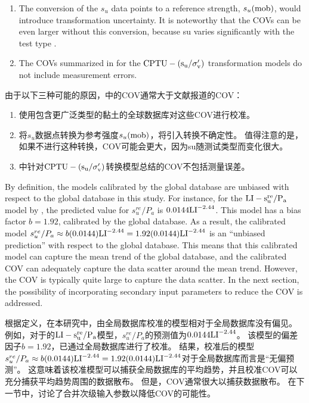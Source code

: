 \begin{paracol}{2}
\begin{enumerate}
        \item The conversion of the $s_u$ data points to a reference strength, $s_u(\rm{mob})$, would introduce transformation uncertainty. It is noteworthy that the COVs can be even larger without this conversion, because su varies significantly with the test type \citep{Ladd1977421}.
        
        \item The COVs summarized in \citet{Ching201252} for the $\rm{CPTU}-(s_u/\sigma_v')$ transformation models do not include measurement errors.
    \end{enumerate}

    \switchcolumn
    
    由于以下三种可能的原因，中的COV通常大于文献报道的COV：
    \begin{enumerate}
        \item 使用包含更广泛类型的黏土的全球数据库对这些COV进行校准。
        
        \item 将$s_u$数据点转换为参考强度$s_u(\rm{mob})$，将引入转换不确定性。 值得注意的是，如果不进行这种转换，COV可能会更大，因为su随测试类型而变化很大\citep{Ladd1977421}。
        
        \item \citet{Ching201252}中针对$\rm{CPTU}-(s_u/\sigma_v')$转换模型总结的COV不包括测量误差。
    \end{enumerate}
    
    \switchcolumn*
    
    By definition, the models calibrated by the global database are unbiased with respect to the global database in this study. For instance, for the $\rm{LI}-s_u^{re}/P_a$ model by \cite{Locat1988799}, the predicted value for $s_u^{re}/P_a$ is $0.0144\rm{LI}^{-2.44}$. This model has a bias factor $b = 1.92$, calibrated by the global database. As a result, the calibrated model $s_u^{re}/P_a\approx{}b(0.0144)\rm{LI}^{-2.44}=1.92(0.0144)\rm{LI}^{-2.44}$ is an “unbiased prediction” with respect to the global database. This means that this calibrated model can capture the mean trend of the global database, and the calibrated COV can adequately capture the data scatter around the mean trend. However, the COV is typically quite large to capture the data scatter. In the next section, the possibility of incorporating secondary input parameters to reduce the COV is addressed.
    
    \switchcolumn
    
    根据定义，在本研究中，由全局数据库校准的模型相对于全局数据库没有偏见。 例如，对于\cite{Locat1988799}的$\rm{LI}-s_u^{re}/P_a$模型，$s_u^{re}/P_a$的预测值为$0.0144\rm{LI}^{-2.44}$。 该模型的偏差因子$b = 1.92$，已通过全局数据库进行了校准。 结果，校准后的模型$s_u^{re}/P_a\approx{}b(0.0144)\rm{LI}^{-2.44}=1.92(0.0144)\rm{LI}^{-2.44}$对于全局数据库而言是“无偏预测”。 这意味着该校准模型可以捕获全局数据库的平均趋势，并且校准COV可以充分捕获平均趋势周围的数据散布。 但是，COV通常很大以捕获数据散布。 在下一节中，讨论了合并次级输入参数以降低COV的可能性。
    
\end{paracol}